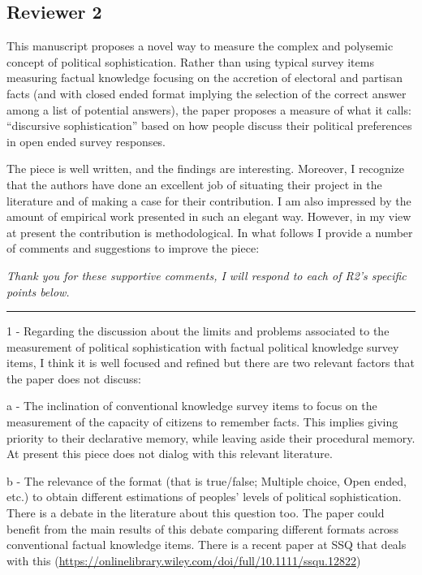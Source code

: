 

\subsection*{Reviewer 2}

This manuscript proposes a novel way to measure the complex and polysemic concept of political sophistication. Rather than using typical survey items measuring factual knowledge focusing on the accretion of electoral and partisan facts (and with closed ended format implying the selection of the correct answer among a list of potential answers), the paper proposes a measure of what it calls: ``discursive sophistication'' based on how people discuss their political preferences in open ended survey responses. 

The piece is well written, and the findings are interesting. Moreover, I recognize that the authors have done an excellent job of situating their project in the literature and of making a case for their contribution. I am also impressed by the amount of empirical work presented in such an elegant way. However, in my view at present the contribution is methodological. In what follows I provide a number of comments and suggestions to improve the piece:

\textit{Thank you for these supportive comments, I will respond to each of R2's specific points below.}


\rule{\linewidth}{.01cm}

1 - Regarding the discussion about the limits and problems associated to the measurement of political sophistication with factual political knowledge survey items, I think it is well focused and refined but there are two relevant factors that the paper does not discuss: 

a - The inclination of conventional knowledge survey items to focus on the measurement of the capacity of citizens to remember facts. This implies giving priority to their declarative memory, while leaving aside their procedural memory. At present this piece does not dialog with this relevant literature.

b - The relevance of the format (that is true/false; Multiple choice, Open ended, etc.) to obtain different estimations of peoples' levels of political sophistication. There is a debate in the literature about this question too. The paper could benefit from the main results of this debate comparing different formats across conventional factual knowledge items. There is a recent paper at SSQ that deals with this (\url{https://onlinelibrary.wiley.com/doi/full/10.1111/ssqu.12822})

